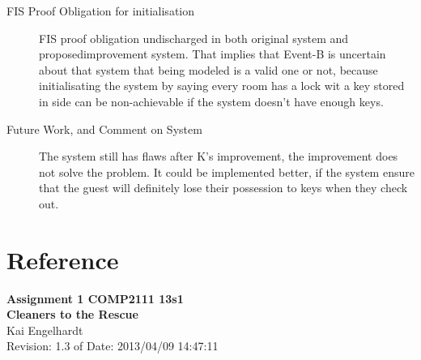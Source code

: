 \documentclass[a4paper]{article}
\begin{document}
\begin{description}
\item[FIS Proof Obligation for initialisation] FIS proof obligation undischarged in both original system and proposedimprovement system. That implies that Event-B is uncertain about that system that being modeled is a valid one or not, because initialisating the system by saying every room has a lock wit a key stored in side can be non-achievable if the system doesn't have enough keys.
\item[Future Work, and Comment on System] The system still has flaws after K's improvement, the improvement does not solve the problem. It could be implemented better, if the system ensure that the guest will definitely lose their possession to keys when they check out.
\end{description}



\newpage
\appendix

\section{Reference}
\begin{center}
\textbf{Assignment 1 COMP2111 13s1\\
Cleaners to the Rescue\\}
Kai Engelhardt\\
Revision: 1.3 of Date: 2013/04/09 14:47:11
\end{center}
\end{document}
